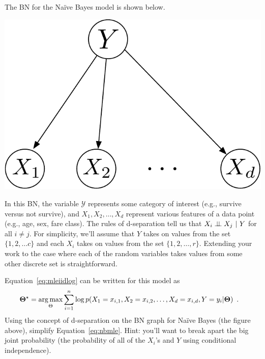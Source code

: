 \documentclass[assignment03_Solutions]{subfiles}
\begin{document}
\vspace{1em}
\begin{exercise}[(60 minutes)]
The BN for the Na\"ive Bayes model is shown below.

\begin{center}
\includegraphics[width=0.3\linewidth]{figures/naivebayesgm}
\end{center}

In this BN, the variable $\mathcal{Y}$ represents some category of interest (e.g., survive versus not survive), and $X_1, X_2, \ldots, X_d$ represent various features of a data point (e.g., age, sex, fare class).  The rules of d-separation tell us that $X_i \perp\!\!\!\perp X_j~|~Y$ for all $i \neq j$.  For simplicity, we'll assume that $Y$ takes on values from the set $\{1, 2, \ldots c \}$ and each $X_i$ takes on values from the set $\{1, 2, \ldots, r\}$.  Extending your work to the case where each of the random variables takes values from some other discrete set is straightforward.


\bes
\item Equation~\ref{eq:mleiidlog} can be written for this model as
\begin{align}
\mathbf{\Theta^\star} &= \operatorname*{arg\,max}_{\Theta} \sum_{i=1}^n \log p(X_1 = x_{i,1}, X_2 = x_{i,2}, \ldots, X_d = x_{i,d}, Y = y_i | \mathbf{\Theta}) \enspace . \label{eq:nbmle}
\end{align}
Using the concept of d-separation on the BN graph for Na\"ive Bayes (the figure above), simplify Equation~\ref{eq:nbmle}.  Hint: you'll want to break apart the big joint probability (the probability of all of the $X_i$'s and $Y$ using conditional independence).


\end{exercise}
\end{document}
